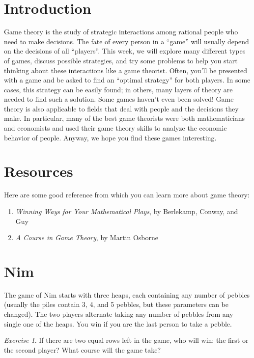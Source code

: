 \documentclass{article}
\theoremstyle{definition}
\theoremstyle{remark}
\newtheorem{exercise}{Exercise}
\begin{document}
\section{Introduction}

    Game theory is the study of strategic interactions among rational people who need to make decisions. 
    The fate of every person in a ``game'' will usually depend on the decisions of all ``players''.
    This week, we will explore many different types of games, discuss possible strategies, and try some problems to help you start thinking about these interactions like a game theorist.
    Often, you'll be presented with a game and be asked to find an ``optimal strategy'' for both players.
    In some cases, this strategy can be easily found; in others, many layers of theory are needed to find such a solution.
    Some games haven't even been solved!
    Game theory is also applicable to fields that deal with people and the decisions they make.
    In particular, many of the best game theorists were both mathematicians and economists and used their game theory skills to analyze the economic behavior of people.
    Anyway, we hope you find these games interesting.

\section{Resources}

    Here are some good reference from which you can learn more about game theory:
    \begin{enumerate}
        \item {\it Winning Ways for Your Mathematical Plays}, by Berlekamp, Conway, and Guy
        \item {\it A Course in Game Theory}, by Martin Osborne
    \end{enumerate}

\section{Nim}

    The game of Nim starts with three heaps, each containing any number of pebbles (usually the piles contain 3, 4, and 5 pebbles, but these parameters can be changed).
    The two players alternate taking any number of pebbles from any single one of the heaps.
    You win if you are the last person to take a pebble.

    \begin{exercise}
        If there are two equal rows left in the game, who will win: the first or the second player?
        What course will the game take?
    \end{exercise}
\end{document}
